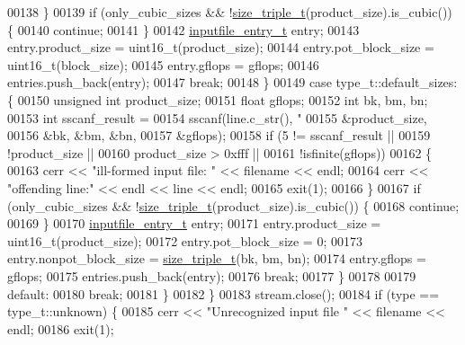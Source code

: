 \begin{DoxyCode}
{00138           \}
00139           \textcolor{keywordflow}{if} (only\_cubic\_sizes && !\hyperlink{structsize__triple__t}{size\_triple\_t}(product\_size).is\_cubic()) \{
00140             \textcolor{keywordflow}{continue};
00141           \}
00142           \hyperlink{structinputfile__entry__t}{inputfile\_entry\_t} entry;
00143           entry.product\_size = uint16\_t(product\_size);
00144           entry.pot\_block\_size = uint16\_t(block\_size);
00145           entry.gflops = gflops;
00146           entries.push\_back(entry);
00147           \textcolor{keywordflow}{break};
00148         \}
00149         \textcolor{keywordflow}{case} type\_t::default\_sizes: \{
00150           \textcolor{keywordtype}{unsigned} \textcolor{keywordtype}{int} product\_size;
00151           \textcolor{keywordtype}{float} gflops;
00152           \textcolor{keywordtype}{int} bk, bm, bn;
00153           \textcolor{keywordtype}{int} sscanf\_result =
00154             sscanf(line.c\_str(), \textcolor{stringliteral}{"%
00155                    &product\_size,
00156                    &bk, &bm, &bn,
00157                    &gflops);
00158           \textcolor{keywordflow}{if} (5 != sscanf\_result ||
00159               !product\_size ||
00160               product\_size > 0xfff ||
00161               !isfinite(gflops))
00162           \{
00163             cerr << \textcolor{stringliteral}{"ill-formed input file: "} << filename << endl;
00164             cerr << \textcolor{stringliteral}{"offending line:"} << endl << line << endl;
00165             exit(1);
00166           \}
00167           \textcolor{keywordflow}{if} (only\_cubic\_sizes && !\hyperlink{structsize__triple__t}{size\_triple\_t}(product\_size).is\_cubic()) \{
00168             \textcolor{keywordflow}{continue};
00169           \}
00170           \hyperlink{structinputfile__entry__t}{inputfile\_entry\_t} entry;
00171           entry.product\_size = uint16\_t(product\_size);
00172           entry.pot\_block\_size = 0;
00173           entry.nonpot\_block\_size = \hyperlink{structsize__triple__t}{size\_triple\_t}(bk, bm, bn);
00174           entry.gflops = gflops;
00175           entries.push\_back(entry);
00176           \textcolor{keywordflow}{break};
00177         \}
00178         
00179         \textcolor{keywordflow}{default}:
00180           \textcolor{keywordflow}{break};
00181       \}
00182     \}
00183     stream.close();
00184     \textcolor{keywordflow}{if} (type == type\_t::unknown) \{
00185       cerr << \textcolor{stringliteral}{"Unrecognized input file "} << filename << endl;
00186       exit(1);
}}
\end{DoxyCode}
